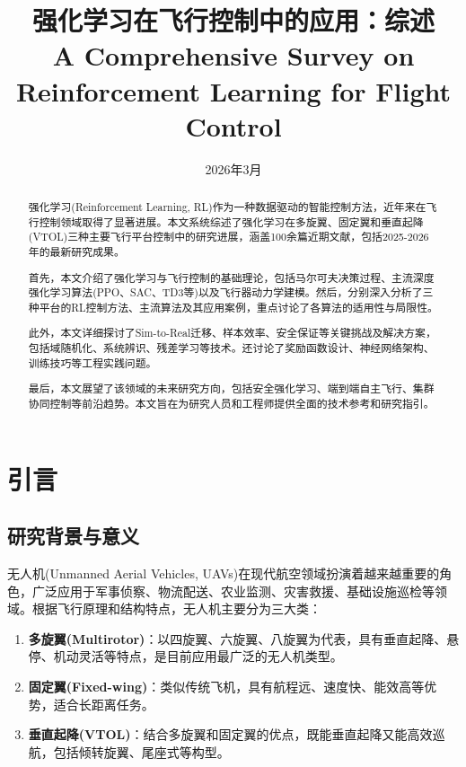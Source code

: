 \documentclass[12pt,a4paper]{ctexart}
\title{\textbf{强化学习在飞行控制中的应用：综述}\\\vspace{0.5cm}\large A Comprehensive Survey on Reinforcement Learning for Flight Control}
\author{}
\date{2026年3月}
\begin{document}
\maketitle

\begin{abstract}
强化学习(Reinforcement Learning, RL)作为一种数据驱动的智能控制方法，近年来在飞行控制领域取得了显著进展。本文系统综述了强化学习在多旋翼、固定翼和垂直起降(VTOL)三种主要飞行平台控制中的研究进展，涵盖100余篇近期文献，包括2025-2026年的最新研究成果。

首先，本文介绍了强化学习与飞行控制的基础理论，包括马尔可夫决策过程、主流深度强化学习算法(PPO、SAC、TD3等)以及飞行器动力学建模。然后，分别深入分析了三种平台的RL控制方法、主流算法及其应用案例，重点讨论了各算法的适用性与局限性。

此外，本文详细探讨了Sim-to-Real迁移、样本效率、安全保证等关键挑战及解决方案，包括域随机化、系统辨识、残差学习等技术。还讨论了奖励函数设计、神经网络架构、训练技巧等工程实践问题。

最后，本文展望了该领域的未来研究方向，包括安全强化学习、端到端自主飞行、集群协同控制等前沿趋势。本文旨在为研究人员和工程师提供全面的技术参考和研究指引。
\end{abstract}

\tableofcontents
\newpage

\section{引言}\label{sec:intro}

\subsection{研究背景与意义}

无人机(Unmanned Aerial Vehicles, UAVs)在现代航空领域扮演着越来越重要的角色，广泛应用于军事侦察、物流配送、农业监测、灾害救援、基础设施巡检等领域。根据飞行原理和结构特点，无人机主要分为三大类：

\begin{enumerate}
    \item \textbf{多旋翼(Multirotor)}：以四旋翼、六旋翼、八旋翼为代表，具有垂直起降、悬停、机动灵活等特点，是目前应用最广泛的无人机类型。
    
    \item \textbf{固定翼(Fixed-wing)}：类似传统飞机，具有航程远、速度快、能效高等优势，适合长距离任务。
    
    \item \textbf{垂直起降(VTOL)}：结合多旋翼和固定翼的优点，既能垂直起降又能高效巡航，包括倾转旋翼、尾座式等构型。
\end{enumerate}
\end{document}
